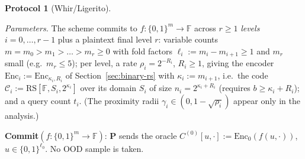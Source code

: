 \documentclass[11pt]{article}
\newcommand{\F}{\mathbb{F}}
\newcommand{\Enc}{\mathrm{Enc}}
\newcommand{\RS}{\mathrm{RS}}
\newcommand{\cube}[1]{\{0,1\}^{#1}}
\theoremstyle{plain}
\theoremstyle{definition}
\newtheorem{protocol}[theorem]{Protocol}
\theoremstyle{remark}
\begin{document}
\begin{protocol}[Whir/Ligerito]\label{fig:protocol}
\ \par\smallskip
\emph{Parameters.} The scheme commits to $f : \cube{m} \to \F$ across $r \ge 1$ \emph{levels} $i = 0, \dots, r-1$ plus a plaintext final level $r$: variable counts $m = m_0 > m_1 > \dots > m_r \ge 0$ with fold factors $\ell_i := m_i - m_{i+1} \ge 1$ and $m_r$ small (e.g.\ $m_r \le 5$); per level, a rate $\rho_i = 2^{-R_i}$, $R_i \ge 1$, giving the encoder $\Enc_i := \Enc_{\kappa_i, R_i}$ of Section~\ref{sec:binary-rs} with $\kappa_i := m_{i+1}$, i.e.\ the code $\mathcal{C}_i := \RS[\F, S_i, 2^{\kappa_i}]$ over its domain $S_i$ of size $n_i = 2^{\kappa_i + R_i}$ (requires $b \ge \kappa_i + R_i$); and a query count $t_i$. (The proximity radii $\gamma_i \in (0, 1 - \sqrt{\rho_i})$ appear only in the analysis.)

\smallskip
\textbf{Commit}$(f : \cube{m} \to \F)$: $\mathbf{P}$ sends the oracle $C^{(0)}[u, \cdot] := \Enc_0(f(u, \cdot))$, $u \in \cube{\ell_0}$. No OOD sample is taken.


\end{protocol}
\end{document}
